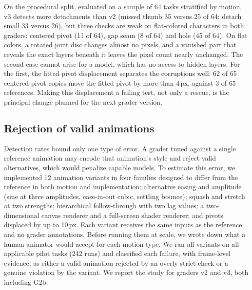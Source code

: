 \documentclass[11pt]{article}
\newcommand{\chk}[1]{\textsf{#1}}
\begin{document}
On the procedural split, evaluated on a sample of 64 tasks stratified by motion, v3 detects more detachments than v2 (missed thumb 35 versus 25 of 64; detach small 33 versus 26), but three checks are weak on flat-colored characters in both graders: centered pivot (11 of 64), gap seam (8 of 64) and hole (45 of 64). On flat colors, a rotated joint disc changes almost no pixels, and a vanished part that reveals the exact layers beneath it leaves the pixel count nearly unchanged. The second case cannot arise for a model, which has no access to hidden layers. For the first, the fitted pivot displacement separates the corruptions well: 62 of 65 centered-pivot copies move the fitted pivot by more than 4\,px, against 3 of 65 references. Making this displacement a failing test, not only a rescue, is the principal change planned for the next grader version.

\subsection{Rejection of valid animations}
\label{sec:falsefail}

Detection rates bound only one type of error. A grader tuned against a single reference animation may encode that animation's style and reject valid alternatives, which would penalize capable models. To estimate this error, we implemented 12 animation variants in four families designed to differ from the reference in both motion and implementation: alternative easing and amplitude (sine at three amplitudes, ease-in-out cubic, settling bounce); squash and stretch at two strengths; hierarchical follow-through with two lag values; a two-dimensional canvas renderer and a full-screen shader renderer; and pivots displaced by up to 10\,px. Each variant receives the same inputs as the reference and no grader annotations. Before running them at scale, we wrote down what a human animator would accept for each motion type. We ran all variants on all applicable pilot tasks (242 runs) and classified each failure, with frame-level evidence, as either a valid animation rejected by an overly strict check or a genuine violation by the variant. We report the study for graders v2 and v3, both including \chk{G2b}.
\end{document}
